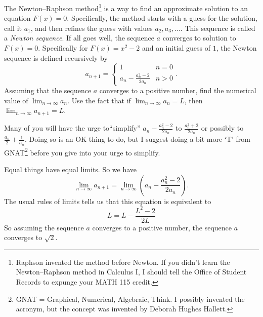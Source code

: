 \documentclass[12pt,fleqn,answers]{exam}
\begin{document}
\begin{questions}
\begin{parts}
\begin{solution}
    \end{solution}






   \end{parts}
 

   \question [2] The Newton–Raphson method\footnote{Raphson invented
   the method before Newton. If you didn't learn the Newton–Raphson method
   in Calculus I, I should tell the Office of Student Records to 
   expunge your MATH 115 credit.} is a way to find an 
   approximate solution to an equation $F(x)=0$. Specifically,
   the method starts with a guess for the solution, call it $a_1$,
   and then refines the guess with values $a_2, a_3, \dots$. 
   This sequence is called a \emph{Newton sequence}.
   If all goes well, the sequence $a$ converges to 
   solution to $F(x)=0$. Specifically for $F(x) = x^2 - 2$ and
   an initial guess of $1$, the Newton sequence  is defined
   recursively by 
   \begin{equation*}
    a_{n+1} = \begin{cases} 1  & n=0  \\
                            a_n - \frac{a_n^2 - 2}{2 a_n} & n > 0
    \end{cases}.
\end{equation*}
Assuming that the sequence $a$ converges to a positive number, find the numerical
value of $\displaystyle \lim_{n \to \infty} a_n$.  Use the 
fact that if $\displaystyle \lim_{n \to \infty} a_n  = L$,
then $\displaystyle \lim_{n \to \infty} a_{n+1} = L$.

\quad Many of you will have the urge to``simplify'' $a_n - \frac{a_n^2 - 2}{2 a_n}$
to $\frac{a_n^2 + 2}{2 a_n}$ or possibly to 
$\frac{a_n}{2} + \frac{1}{a_n}$. Doing so is an OK thing to do,
but I suggest doing a bit more `T' from GNAT\footnote{GNAT = Graphical,
Numerical, Algebraic, Think. I possibly invented the acronym, but 
the concept was invented by Deborah Hughes Hallett.} before you give into your urge to simplify.

\begin{solution}
Equal things have equal limits. So we have
\begin{equation*}
  \lim_{n \to \infty} a_{n+1}   = \lim_{n \to \infty} \left(a_n - \frac{a_n^2 - 2}{2 a_n}\right).
\end{equation*}
The usual rules of limits tells us that this equation is equivalent to 
\begin{equation*}
  L   = L  - \frac{L^2 - 2}{2 L}
\end{equation*}
So assuming the sequence $a$ converges to a positive number,  the sequence $a$ converges to $\sqrt{2}$.


\end{solution}
\end{questions}
\end{document}
